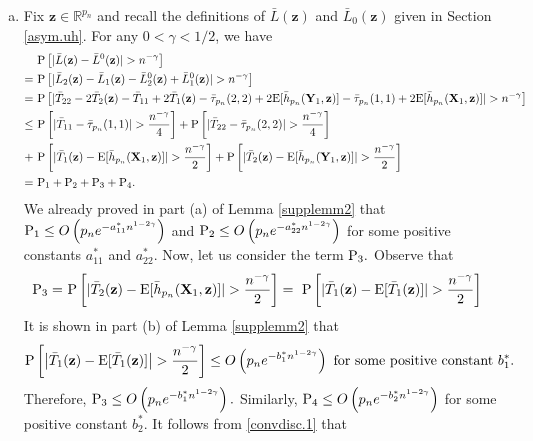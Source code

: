 \documentclass[twoside]{article}
\newcommand{\bX}{\mathbf{X}}
\newcommand{\bY}{\mathbf{Y}}
\newcommand{\bz}{\mathbf{z}}
\newcommand{\0}{\mathbf{0}}
\newcommand{\1}{\mathbf{1}}
\numberwithin{equation}{section}
\begin{document}
\begin{enumerate}[(a)]
 \item Fix $\bz\in\mathbb{R}^{p_n}$ and recall the definitions of $\bar{L}(\bz)$ and $\bar{L}_0(\bz)$ given in Section \ref{asym.uh}. For any $0<\gamma<1/2$, we have \begin{align}\label{convdisc.1}
        &\ {\rm P}\left [|\bar{L}(\bz)- \bar{L}^0(\bz) |>n^{-\gamma}\right ]\nonumber \\
        = &\ {\rm P}\left [|\bar{L}_2(\bz)- \bar{L}_1(\bz)- \bar{L}^0_2(\bz) + \bar{L}^0_1(\bz) |>n^{-\gamma}\right ]\nonumber \\
        = &\ {\rm P}\left [|\bar{T}_{22}- 2\bar{T}_{2}(\bz)-\bar{T}_{11}+ 2\bar{T}_{1}(\bz)- \bar{\tau}_{p_n}(2,2) + 2{\rm E}[\bar{h}_{p_n}(\bY_1,\bz)] - \bar{\tau}_{p_n}(1,1) + 2{\rm E}[\bar{h}_{p_n}(\bX_1,\bz)] |>n^{-\gamma}\right ]\nonumber \\
        \leq &\ {\rm P}\left [|\bar{T}_{11} - \bar{\tau}_{p_n}(1,1) |>\frac{n^{-\gamma}}{4}\right ] + {\rm P}\left [|\bar{T}_{22}- \bar{\tau}_{p_n}(2,2)|>\frac{n^{-\gamma}}{4}\right ] \nonumber \\
        +&\  {\rm P}\left [|\bar{T}_{1}(\bz)- {\rm E}[\bar{h}_{p_n}(\bX_1,\bz)]|>\frac{n^{-\gamma}}{2}\right ] + {\rm P}\left [|\bar{T}_{2}(\bz)- {\rm E}[\bar{h}_{p_n}(\bY_1,\bz)]|>\frac{n^{-\gamma}}{2}\right ]\nonumber \\
        =&\ {\rm P}_1 +{\rm P}_2 +{\rm P}_3 +{\rm P}_4.
       \end{align}
       We already proved in part (a) of Lemma \ref{supplemm2} that ${\rm P}_1\leq O\left (p_ne^{-a^*_{11}n^{1-2\gamma}}\right )$ and ${\rm P}_2\leq O\left (p_ne^{-a^*_{22}n^{1-2\gamma}}\right )$ for some positive constants $a^*_{11}$ and $a^*_{22}.$ Now, let us consider the term ${\rm P}_3.$ Observe that
\begin{align*}
 {\rm P}_3  = &\ {\rm P}\left [|\bar{T}_{2}(\bz)- {\rm E}[\bar{h}_{p_n}(\bX_1,\bz)]|>\frac{n^{-\gamma}}{2}\right ] =\ {\rm P}\left [|\bar{T}_{1}(\bz)- {\rm E}[\bar{T}_{1}(\bz)]|>\frac{n^{-\gamma}}{2}\right ]
\end{align*}
It is shown in part (b) of Lemma \ref{supplemm2} that $${\rm P}\left [\left |\bar{T}_{1}(\bz)- {\rm E}[\bar{T}_{1}(\bz)]\right |>\frac{n^{-\gamma}}{2}\right ]\leq O\left( p_n e^{-b^*_1 n^{1-2\gamma}}\right )\text{ for some positive constant }b^*_1.$$
Therefore, ${\rm P}_3\leq O\left( p_n e^{-b^*_1 n^{1-2\gamma}}\right ).$ Similarly, ${\rm P}_4\leq O\left( p_n e^{-b^*_2 n^{1-2\gamma}}\right )$ for some positive constant $b^*_2.$ It follows from \eqref{convdisc.1} that

\end{enumerate}
\end{document}
